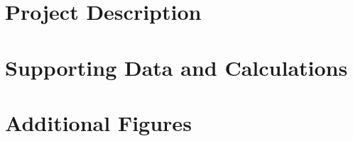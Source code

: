 
\begin{appendices}

\chapter{Project Description}
\label{app:project_description}


\lipsum[12] %

\chapter{Supporting Data and Calculations}
\label{app:data}

\lipsum[13] %

\chapter{Additional Figures}
\label{app:figures}

\lipsum[14] %


\end{appendices}
